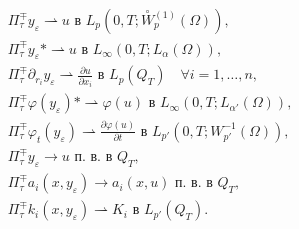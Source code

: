 \begin{align}


&\Pi^{\mp}_{\tau} y_\varepsilon


\rightharpoonup u \text{ в }


 L_{p}( 0,T; \overset \circ W{}^{(1)}_{p} (\Omega ) ),\label{3.14ch}\\


%


&\Pi^{\mp}_{\tau} y_\varepsilon


* \rightharpoonup u \text{ в }


L_{\infty }( 0,T; L_{\alpha }(\Omega ) ),\label{sa}\\


%


&\Pi^{\mp}_{\tau} \partial_{r_i} y_\varepsilon \rightharpoonup 


\frac{\partial u}{\partial x_i}\text


{ в } L_p(Q_T)\quad \forall i=1,\dotsc,n,\\


%


&\Pi^{\mp}_{\tau} \varphi(y_\varepsilon)


* \rightharpoonup \varphi(u) \text{ в } 


L_{\infty }( 0,T; L_{\alpha '}(\Omega ) ),


\label{3.15ch}\\


%


&\Pi^{\mp}_{\tau} \varphi_{t}(y_\varepsilon)


\rightharpoonup \frac{\partial \varphi(u)}{\partial t} 


\text{ в } L_{p'}( 0,T; W^{-1}_{p'} (\Omega ) ), 


\label{3.16ch}\\


%


&\Pi^{\mp}_\tau  y_\varepsilon \to


 u \text{ п. в. в }  Q_T,


\label{3.18ch}\\


%


&\Pi^{\mp}_{\tau}a_{i}(x,y_\varepsilon)


\to a_{i}(x,u) \text{ п. в. в } Q_{T},\label{3.19ch}\\


%


&\Pi^{\mp}_{\tau} k_{i}(x,y_\varepsilon) \rightharpoonup  


K_{i} \text{ в } L_{p'}(Q_{T}).\label{3.20ch}


\end{align}


